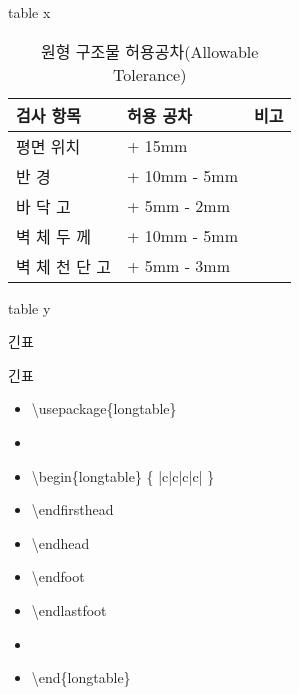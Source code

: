\documentclass[ aspectratio=149,  14pt,blue,xcolor=pdftex,dvipsnames,table,handout,notes]{beamer}
\begin{document}
\begin{frame}[t]{table x}
			\begin{example}
				\begin{table}[h]
				\caption {원형 구조물 허용공차(Allowable Tolerance)}
				\centering 
				\begin{tabularx}{0.8\textwidth}{ X X c }
				\toprule
				검사  항목	&허용  공차&비고\\
				\midrule
				평면  위치		&+ 15mm\\
				반          경	&+ 10mm  - 5mm\\
				바    닥    고		&+  5mm  - 2mm\\
				벽  체  두  께		&+ 10mm  - 5mm\\
				벽 체 천 단 고		&+  5mm  - 3mm\\
				\bottomrule
				\end{tabularx} 
				\label{table-1}
				\end{table}
			\end{example}



		\end{frame}

		\begin{frame}[t]{table y}



		\end{frame}

		\begin{frame}[t]{긴표}

		\begin{block}{긴표}
		\begin{itemize}
		\item[] \textbackslash usepackage\{longtable\}
		\item[] 
		\item[]	\textbackslash begin\{longtable\} \{ |c|c|c|c| \}
		\item[]	\hspace{2em} \textbackslash endfirsthead
		\item[]	\hspace{2em} \textbackslash endhead
		\item[]	\hspace{2em} \textbackslash endfoot
		\item[]	\hspace{2em} \textbackslash endlastfoot
		\item[]	
		\item[]	\textbackslash end\{longtable\} 
		\end{itemize}
		\end{block}



		
		\end{frame}
\end{document}
